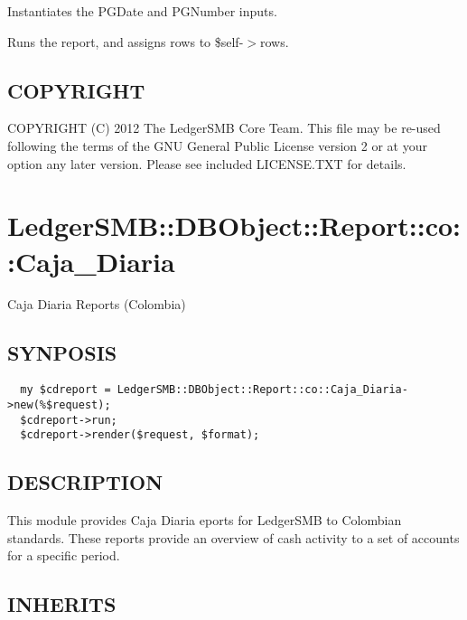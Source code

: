 \begin{description}
\begin{description}
\begin{description}
\begin{description}
\begin{description}
\begin{description}
\begin{description}
\begin{description}
\begin{description}
\begin{description}
\begin{description}
Instantiates the PGDate and PGNumber inputs.


\item[{run\_report()}] \mbox{}

Runs the report, and assigns rows to \$self-$>$rows.

\end{description}
\subsection*{COPYRIGHT\label{LedgerSMB::DBObject::Report::co::Balance_y_Mayor_COPYRIGHT}}


COPYRIGHT (C) 2012 The LedgerSMB Core Team.  This file may be re-used following
the terms of the GNU General Public License version 2 or at your option any
later version.  Please see included LICENSE.TXT for details.

\section{LedgerSMB::DBObject::Report::co::Caja\_Diaria\label{LedgerSMB::DBObject::Report::co::Caja_Diaria}}


Caja Diaria Reports (Colombia)

\subsection*{SYNPOSIS\label{LedgerSMB::DBObject::Report::co::Caja_Diaria_SYNPOSIS}}
\begin{verbatim}
  my $cdreport = LedgerSMB::DBObject::Report::co::Caja_Diaria->new(%$request);
  $cdreport->run;
  $cdreport->render($request, $format);
\end{verbatim}
\subsection*{DESCRIPTION\label{LedgerSMB::DBObject::Report::co::Caja_Diaria_DESCRIPTION}}


This module provides Caja Diaria eports for LedgerSMB to Colombian standards.
These reports provide an overview of cash activity to a set of accounts for a
specific period.

\subsection*{INHERITS\label{LedgerSMB::DBObject::Report::co::Caja_Diaria_INHERITS}}
\begin{description}


\end{description}
\end{description}
\end{description}
\end{description}
\end{description}
\end{description}
\end{description}
\end{description}
\end{description}
\end{description}
\end{description}
